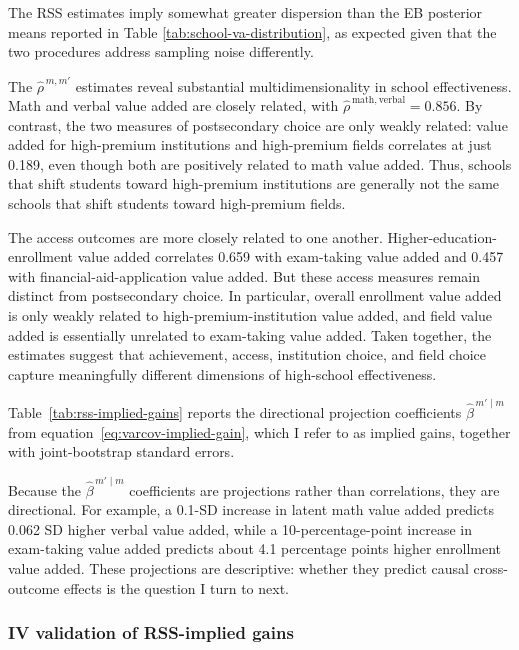 \documentclass[a4paper, article, english, oneside, unknownkeysallowed, 12pt]{memoir}
\begin{document}


The RSS estimates imply somewhat greater dispersion than the EB posterior means reported in Table \ref{tab:school-va-distribution}, 
as expected given that the two procedures address sampling noise differently.


The $\widehat\rho^{\,m,m'}$ estimates reveal substantial multidimensionality in school effectiveness.
Math and verbal value added are closely related, with $\widehat\rho^{\,\mathrm{math},\mathrm{verbal}}=0.856$.
By contrast, the two measures of postsecondary choice are only weakly related:
value added for high-premium institutions and high-premium fields correlates at just 0.189, even though both are positively related to math value added.
Thus, schools that shift students toward high-premium institutions are generally not the same schools that shift students toward high-premium fields.

The access outcomes are more closely related to one another. 
Higher-education-enrollment value added correlates 0.659 with exam-taking value added and 0.457 with financial-aid-application value added.
But these access measures remain distinct from postsecondary choice. 
In particular, overall enrollment value added is only weakly related to high-premium-institution value added, and field value added is
essentially unrelated to exam-taking value added. 
Taken together, the estimates suggest that achievement,
access, institution choice, and field choice capture meaningfully different dimensions of high-school
effectiveness.

Table~\ref{tab:rss-implied-gains} reports the directional projection coefficients
$\widehat\beta^{\,m'\mid m}$ from equation~\eqref{eq:varcov-implied-gain}, which I refer to
as implied gains, together with joint-bootstrap standard errors.



Because the $\widehat\beta^{\,m'\mid m}$ coefficients are projections rather than
correlations, they are directional.
For example, a 0.1-SD increase in latent math value added predicts 0.062 SD higher verbal value added, while a 10-percentage-point increase in exam-taking value added predicts about 4.1 percentage points higher enrollment value added. 
These projections are descriptive: whether they predict causal cross-outcome effects is the question I turn to next.

\subsubsection{IV validation of RSS-implied gains}
\end{document}
